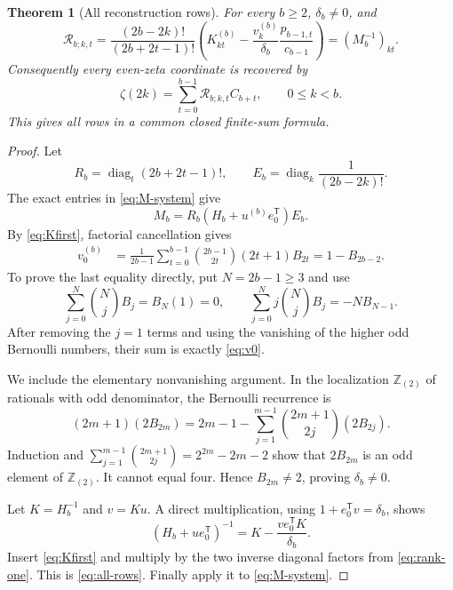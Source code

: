 \documentclass[11pt,letterpaper]{article}
\newtheorem{theorem}{Theorem}[section]
\theoremstyle{definition}
\theoremstyle{remark}
\newcommand{\Z}{\mathbb Z}
\numberwithin{equation}{section}
\begin{document}
\begin{theorem}[All reconstruction rows]
\label{thm:all-rows}
For every $b\geq2$, $\delta_b\ne0$, and
\begin{equation}\label{eq:all-rows}
 \boxed{\displaystyle
 \mathcal R_{b;k,t}=
 \frac{(2b-2k)!}{(2b+2t-1)!}
 \left(
 K_{kt}^{(b)}-
 \frac{v_k^{(b)}}{\delta_b}\frac{p_{b-1,t}}{c_{b-1}}
 \right)
 =(M_b^{-1})_{kt}.}
\end{equation}
Consequently every even-zeta coordinate is recovered by
\begin{equation}\label{eq:all-coordinates}
 \boxed{\displaystyle
 \zeta(2k)=\sum_{t=0}^{b-1}\mathcal R_{b;k,t}C_{b+t},
 \qquad 0\leq k<b.}
\end{equation}
This gives all rows in a common closed finite-sum formula.
\end{theorem}
\begin{proof}
Let
\[
 R_b=\operatorname{diag}_{t}(2b+2t-1)!,\qquad
 E_b=\operatorname{diag}_{k}\frac1{(2b-2k)!}.
\]
The exact entries in \eqref{eq:M-system} give
\begin{equation}\label{eq:rank-one}
 M_b=R_b(H_b+u^{(b)}e_0^{\mathsf T})E_b.
\end{equation}
By \eqref{eq:Kfirst}, factorial cancellation gives
\begin{align}\label{eq:v0}
 v_0^{(b)}
 &=\frac1{2b-1}\sum_{t=0}^{b-1}
   \binom{2b-1}{2t}(2t+1)B_{2t}
 =1-B_{2b-2}.
\end{align}
To prove the last equality directly, put $N=2b-1\geq3$ and use
\[
 \sum_{j=0}^N\binom NjB_j=B_N(1)=0,\qquad
 \sum_{j=0}^N j\binom NjB_j=-NB_{N-1}.
\]
After removing the $j=1$ terms and using the vanishing of the higher
odd Bernoulli numbers, their sum is exactly \eqref{eq:v0}.

We include the elementary nonvanishing argument. In the localization
$\Z_{(2)}$ of rationals with odd denominator, the Bernoulli recurrence
is
\[
 (2m+1)(2B_{2m})=2m-1-
  \sum_{j=1}^{m-1}\binom{2m+1}{2j}(2B_{2j}).
\]
Induction and
$\sum_{j=1}^{m-1}\binom{2m+1}{2j}=2^{2m}-2m-2$
show that $2B_{2m}$ is an odd element of $\Z_{(2)}$.
It cannot equal four. Hence $B_{2m}\ne2$, proving $\delta_b\ne0$.

Let $K=H_b^{-1}$ and $v=Ku$. A direct multiplication, using
$1+e_0^{\mathsf T}v=\delta_b$, shows
\[
 (H_b+ue_0^{\mathsf T})^{-1}
 =K-\frac{ve_0^{\mathsf T}K}{\delta_b}.
\]
Insert \eqref{eq:Kfirst} and multiply by the two inverse diagonal
factors from \eqref{eq:rank-one}. This is \eqref{eq:all-rows}.
Finally apply it to \eqref{eq:M-system}.
\end{proof}
\end{document}
